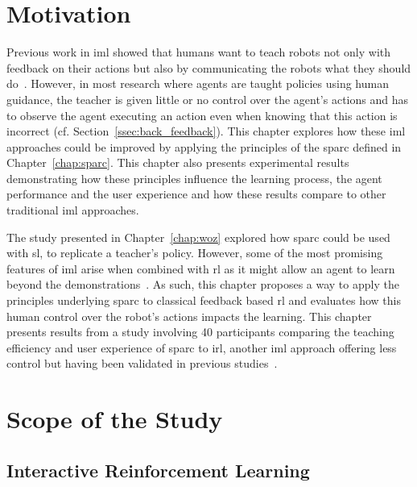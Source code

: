 \newpage
\section{Motivation}

Previous work in \gls{iml} showed that humans want to teach robots not only with feedback on their actions but also by communicating the robots what they should do~\citep{thomaz2008teachable,amershi2014power}. However, in most research where agents are taught policies using human guidance, the teacher is given little or no control over the agent's actions and has to observe the agent executing an action even when knowing that this action is incorrect (cf. Section~\ref{ssec:back_feedback}). This chapter explores how these \gls{iml} approaches could be improved by applying the principles of the \gls{sparc} defined in Chapter~\ref{chap:sparc}. This chapter also presents experimental results demonstrating how these principles influence the learning process, the agent performance and the user experience and how these results compare to other traditional \gls{iml} approaches.

The study presented in Chapter~\ref{chap:woz} explored how \gls{sparc} could be used with \acrlong{sl}, to replicate a teacher's policy. However, some of the most promising features of \gls{iml} arise when combined with \gls{rl} as it might allow an agent to learn beyond the demonstrations~\citep{abbeel2004apprenticeship}. As such, this chapter proposes a way to apply the principles underlying \gls{sparc} to classical feedback based \gls{rl} and evaluates how this human control over the robot's actions impacts the learning. This chapter presents results from a study involving 40 participants comparing the teaching efficiency and user experience of \gls{sparc} to \gls{irl}, another \gls{iml} approach offering less control but having been validated in previous studies~\citep{thomaz2008teachable}. %

\section{Scope of the Study}


\subsection{Interactive Reinforcement Learning}


